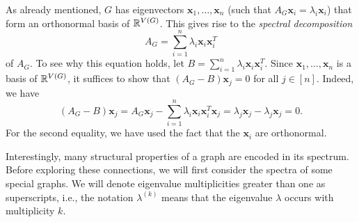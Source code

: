 As already mentioned, $G$ has eigenvectors $\bm{x}_1, \dots, \bm{x}_n$ (such that $A_G \bm{x}_i = \lambda_i \bm{x}_i$) that form an orthonormal basis of $\mathbb{R}^{V(G)}$.
This gives rise to the \textit{spectral decomposition} 
\begin{equation*}
A_G = \sum _{i = 1}^n \lambda_i \bm{x}_i \bm{x}_i ^T
\end{equation*}
of $A_G$. 
To see why this equation holds, let $B = \sum _{i = 1}^n \lambda_i \bm{x}_i \bm{x}_i ^T$. 
Since $\bm{x}_1, \dots, \bm{x}_n$ is a basis of $\mathbb{R}^{V(G)}$, it suffices to show that $(A_G - B) \bm{x}_j = 0$ for all $j \in [n]$.
Indeed, we have
\begin{equation*}
    (A_G - B) \bm{x}_j = A_G \bm{x}_j - \sum _{i = 1}^n \lambda_i \bm{x}_i \bm{x}_i ^T \bm{x}_j = \lambda_j \bm{x}_j - \lambda_j \bm{x}_j = 0.
\end{equation*}
For the second equality, we have used the fact that the $\bm{x}_i$ are orthonormal.

Interestingly, many structural properties of a graph are encoded in its spectrum. 
Before exploring these connections, we will first consider the spectra of some special graphs. 
%
%
We will denote eigenvalue multiplicities greater than one as superscripts, i.e., the notation $\lambda^{(k)}$ means that the eigenvalue $\lambda$ occurs with multiplicity $k$.

